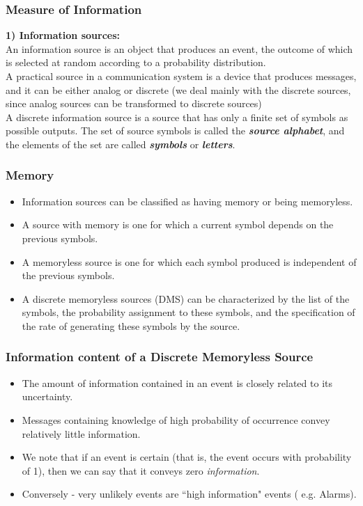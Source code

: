 \documentclass[a4]{beamer}
\begin{document}
\begin{frame}
\frametitle{Measure of Information}

\textbf{1) Information sources:}\\

An information source is an object that produces an event, the outcome of which is selected at
random according to a probability distribution.  \\ \bigskip A practical source in a communication system is a
device that produces messages, and it can be either analog or discrete (we deal mainly
with the discrete sources, since analog sources can be transformed to discrete sources) \\ \bigskip A discrete information source is a
source that has only a finite set of symbols as possible outputs. The set of source symbols is called the
\textbf{\emph{source alphabet}}, and the elements of the set are called \textbf{\emph{ symbols}} or \textbf{\emph{letters}}.
\end{frame}
\begin{frame}
\frametitle{Memory}
\begin{itemize} \item Information sources can be classified as having memory or being memoryless.
\item A source with
memory is one for which a current symbol depends on the previous symbols.\item A memoryless source is
one for which each symbol produced is independent of the previous symbols.

\item A discrete memoryless sources (DMS) can be characterized by the list of the symbols, the
probability assignment to these symbols, and the specification of the rate of generating these symbols by the source.\end{itemize}
\end{frame}

\begin{frame}
\frametitle{Information content of a Discrete Memoryless Source}
\begin{itemize}
\item The amount of information contained in an event is closely related to its uncertainty.
\item Messages containing knowledge of high probability of occurrence convey relatively little information.

\item We note that if an event is certain (that is, the event occurs with probability of 1), then we can say that it conveys zero \textit{information}.

\item Conversely - very unlikely events are ``high information" events ( e.g. Alarms).
\end{itemize}
\end{frame}
\end{document}
